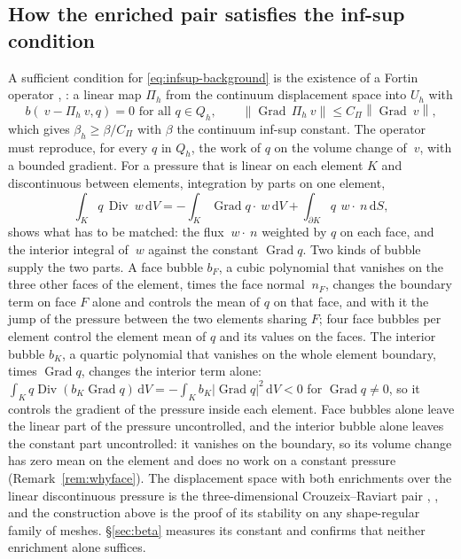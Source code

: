 \documentclass[11pt]{article}
\newcommand{\Grad}{\operatorname{Grad}}
\newcommand{\Div}{\operatorname{Div}}
\newcommand{\norm}[1]{\left\lVert #1 \right\rVert}
\newcommand{\diff}{\,\mathrm{d}}
\theoremstyle{definition}
\theoremstyle{plain}
\begin{document}
\subsection{How the enriched pair satisfies the inf-sup condition}
\label{sec:fortin}

A sufficient condition for \eqref{eq:infsup-background} is the existence of
a Fortin operator \citep{Fortin:1977}, \citep[\S5.4]{BoffiBrezziFortin:2013}:
a linear map $\Pi_h$ from the continuum displacement space into $U_h$ with
\begin{equation}
  \label{eq:fortin}
  b(~v - \Pi_h ~v, q) = 0 \text{ for all } q \in Q_h,
  \qquad
  \norm{\Grad\, \Pi_h ~v} \le C_\Pi \norm{\Grad ~v} ,
\end{equation}
which gives $\beta_h \ge \beta / C_\Pi$ with $\beta$ the continuum inf-sup
constant. The operator must reproduce, for every $q$ in $Q_h$, the work of
$q$ on the volume change of $~v$, with a bounded gradient. For a pressure
that is linear on each element $K$ and discontinuous between elements,
integration by parts on one element,
\begin{equation}
  \label{eq:parts}
  \int_K q \, \Div ~w \diff V
  = - \int_K \Grad q \cdot ~w \diff V + \int_{\partial K} q \, ~w \cdot ~n \diff S ,
\end{equation}
shows what has to be matched: the flux $~w \cdot ~n$ weighted by $q$ on each
face, and the interior integral of $~w$ against the constant $\Grad q$.
Two kinds of bubble supply the two parts. A face bubble $b_F$, a cubic
polynomial that vanishes on the three other faces of the element, times the
face normal $~n_F$, changes the boundary term on face $F$ alone and controls
the mean of $q$ on that face, and with it the jump of the pressure between
the two elements sharing $F$; four face bubbles per element control the
element mean of $q$ and its values on the faces. The interior bubble $b_K$,
a quartic polynomial that vanishes on the whole element boundary, times
$\Grad q$, changes the interior term alone:
$\int_K q \Div(b_K \Grad q) \diff V = - \int_K b_K \lvert \Grad q \rvert^2
\diff V < 0$ for $\Grad q \ne 0$, so it controls the gradient of the
pressure inside each element. Face bubbles alone leave the linear part of
the pressure uncontrolled, and the interior bubble alone leaves the constant
part uncontrolled: it vanishes on the boundary, so its volume change has
zero mean on the element and does no work on a constant pressure
(Remark~\ref{rem:whyface}). The displacement space with both enrichments
over the linear discontinuous pressure is the three-dimensional
Crouzeix--Raviart pair \citep{CrouzeixRaviart:1973},
\citep[Example~8.7.2]{BoffiBrezziFortin:2013}, and the construction above is
the proof of its stability on any shape-regular family of meshes.
\S\ref{sec:beta} measures its constant and confirms that neither enrichment
alone suffices.
\end{document}
